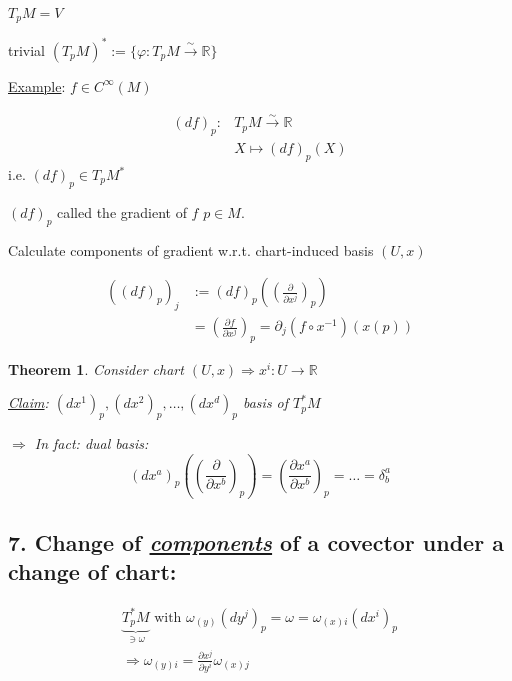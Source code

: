 \documentclass[10pt]{amsart}
\newtheorem{theorem}{Theorem}
\begin{document}
\begin{multicols*}{2}
	$T_pM = V$
	
	trivial $(T_pM)^* := \lbrace \varphi : T_pM \xrightarrow{\sim} \mathbb{R} \rbrace$
	
	\underline{Example}: $f\in C^{\infty}(M)$ 
	
	\[
	\begin{aligned}
	(df)_p : & T_p M \xrightarrow{ \sim } \mathbb{R} \\ 
	& X \mapsto (df)_p(X)
	\end{aligned}
	\]
	i.e. $\boxed{ (df)_p \in T_pM^* } $
	
	$(df)_p$ called the gradient of $f$ \@ $p\in M$.  
	
	Calculate components of gradient w.r.t. chart-induced basis $(U,x)$  
	
	\[
	\begin{aligned}
	\left( (df)_p \right)_j & := (df)_p\left( \left( \frac{ \partial }{ \partial x^j} \right)_p \right) \\
	& = \left( \frac{ \partial f}{ \partial x^j } \right)_p = \partial_j (f\circ x^{-1} )(x(p))
	\end{aligned}
	\]
	
	\begin{theorem}
		Consider chart $(U,x)  \Longrightarrow x^i : U \to \mathbb{R}$  
		
		\underline{Claim}: $(d x^1)_p, (dx^2)_p, \dots , (dx^d)_p$ basis of $T_p^*M$ 
		
		$\Longrightarrow $ In fact: dual basis: 
		\[
		(dx^a)_p \left( \left( \frac{ \partial }{ \partial x^b} \right)_p \right) = \left( \frac{ \partial x^a}{ \partial x^b} \right)_p = \dots = \delta_b^a
		\]
	\end{theorem}
	
	\subsection{ 7. Change of \emph{ \underline{components} } of a covector under a change of chart: }
	
	\[
	\begin{gathered}
	\underbrace{ T_p^*M }_{ \ni \omega} \text{ with } 
	\omega_{(y)} (dy^j)_p =   \omega = \omega_{(x)i} (dx^i)_p  \\
	\Longrightarrow \boxed{ \omega_{(y)i} = \frac{ \partial x^j}{ \partial y^i } \omega_{(x)j } }
	\end{gathered}
	\]
	
	
	
	
	
	
	

\end{multicols*}
\end{document}
